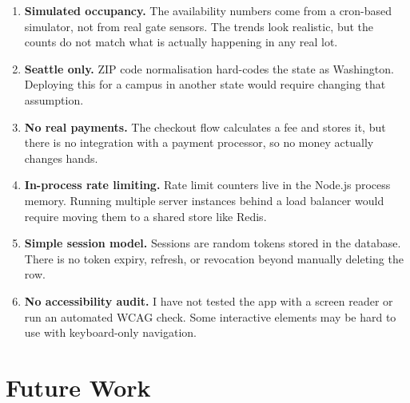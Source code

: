 \documentclass[11pt,letterpaper]{article}
\begin{document}
\begin{enumerate}[leftmargin=1.4em]
  \item \textbf{Simulated occupancy.}
        The availability numbers come from a cron-based simulator, not from
        real gate sensors. The trends look realistic, but the counts do not
        match what is actually happening in any real lot.

  \item \textbf{Seattle only.}
        ZIP code normalisation hard-codes the state as Washington.
        Deploying this for a campus in another state would require changing
        that assumption.

  \item \textbf{No real payments.}
        The checkout flow calculates a fee and stores it, but there is no
        integration with a payment processor, so no money actually changes hands.

  \item \textbf{In-process rate limiting.}
        Rate limit counters live in the Node.js process memory. Running
        multiple server instances behind a load balancer would require
        moving them to a shared store like Redis.

  \item \textbf{Simple session model.}
        Sessions are random tokens stored in the database. There is no
        token expiry, refresh, or revocation beyond manually deleting the row.

  \item \textbf{No accessibility audit.}
        I have not tested the app with a screen reader or run an automated
        WCAG check. Some interactive elements may be hard to use with
        keyboard-only navigation.
\end{enumerate}

\section{Future Work}
\end{document}
